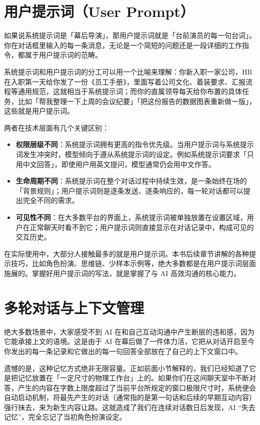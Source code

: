 \section{用户提示词（User Prompt）}
\label{sec:user-prompt}

如果说系统提示词是「幕后导演」，那用户提示词就是「台前演员的每一句台词」。你在对话框里输入的每一条消息，无论是一个简短的问题还是一段详细的工作指令，都属于用户提示词的范畴。

系统提示词和用户提示词的分工可以用一个比喻来理解：你新入职一家公司，HR 在入职第一天给你发了一份《员工手册》，里面写着公司文化、着装要求、汇报流程等通用规范，这就相当于系统提示词；而你的直属领导每天给你布置的具体任务，比如「帮我整理一下上周的会议纪要」「把这份报告的数据图表重新做一版」，这些就是用户提示词。

两者在技术层面有几个关键区别：

\begin{itemize}
  \item \textbf{权限层级不同}：系统提示词拥有更高的指令优先级。当用户提示词与系统提示词发生冲突时，模型倾向于遵从系统提示词的设定。例如系统提示词要求「只用中文回答」，即使用户用英文提问，模型通常仍会用中文作答。
  \item \textbf{生命周期不同}：系统提示词在整个对话过程中持续生效，是一条始终在场的「背景规则」；用户提示词则是逐条发送、逐条响应的，每一轮对话都可以提出完全不同的需求。
  \item \textbf{可见性不同}：在大多数平台的界面上，系统提示词被单独放置在设置区域，用户在正常聊天时看不到它；用户提示词则直接显示在对话记录中，构成可见的交互历史。
\end{itemize}

在实际使用中，大部分人接触最多的就是用户提示词。本书后续章节讲解的各种提示技巧，比如角色扮演、思维链、少样本示例等，绝大多数都是在用户提示词层面施展的。掌握好用户提示词的写法，就是掌握了与 AI 高效沟通的核心能力。

\section{多轮对话与上下文管理}
\label{sec:multi-turn}

绝大多数场景中，大家感受不到 AI 在和自己互动沟通中产生断层的违和感，因为它能承接上文的语境。这是由于 AI 在幕后做了一件体力活，它把从对话开启至今你发出的每一条记录和它做出的每一句回答全部放在了自己的上下文窗口中。

遗憾的是，这种记忆方式绝非无限容量。正如前面小节解释的，我们已经知道了它是把记忆放置在「一定尺寸的物理工作台」上的。如果你们在这间聊天室中不断对答，产生的内容在字数上限度超过了当前平台所规定的窗口极限尺寸时，系统便会自动启动机制，将最先产生的对话（通常指的是第一句话和后续的早期互动内容）强行抹去，来为新生内容让路。这就造成了我们在连续对话数日后发现，AI “失去记忆”，完全忘记了当初角色扮演设定。

